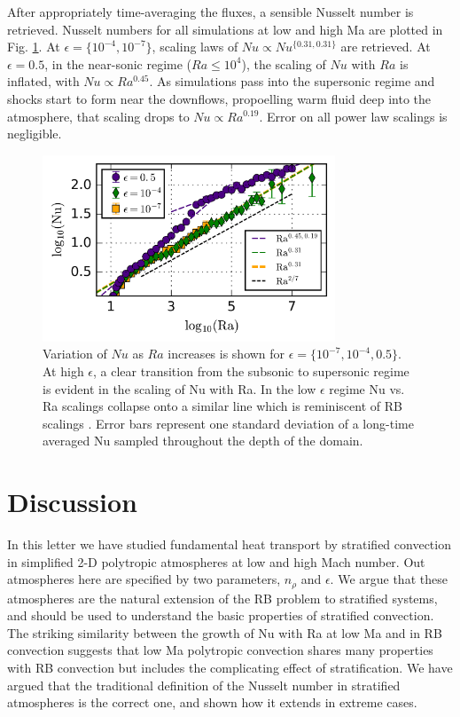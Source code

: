 \documentclass[aps, prl, twocolumn, nofootinbib, groupedaddress, amsfonts, amssymb, amsmath]{revtex4-1}
\newcommand{\nrho}{\ensuremath{n_{\rho}}}
\begin{document}
After appropriately time-averaging the fluxes, a sensible Nusselt number is retrieved.  Nusselt numbers for
all simulations at low and high Ma are plotted in Fig. \ref{fig:nu_v_ra}.  At $\epsilon = \{10^{-4}, 10^{-7}\}$,
scaling laws of $Nu \propto Nu^{\{0.31, 0.31\}}$ are retrieved.  At $\epsilon = 0.5$, in the near-sonic
regime ($Ra \leq 10^4$), the scaling of $Nu$ with $Ra$ is inflated, with $Nu \propto Ra^{0.45}$.  As simulations
pass into the supersonic regime and shocks start to form near the downflows, propoelling warm fluid deep
into the atmosphere, that scaling drops to $Nu \propto Ra^{0.19}$.  Error on all power law scalings is
negligible.

\begin{figure}[t]
\includegraphics[width=3.4375in]{./figs/nu_v_ra.png}
\caption{Variation of $Nu$ as $Ra$ increases is shown for $\epsilon = \{10^{-7}, 10^{-4}, 0.5\}$. 
At high $\epsilon$, a clear transition from the subsonic to supersonic regime is evident in the scaling
of Nu with Ra.  In the low $\epsilon$ regime Nu vs. Ra scalings collapse onto a similar line which is
reminiscent of RB scalings \cite{johnston&doering2009}.  Error bars represent one standard deviation
of a long-time averaged Nu sampled throughout the depth of the domain.
\label{fig:nu_v_ra} }
\end{figure}

\section{Discussion}
\label{sec:discussion}
In this letter we have studied fundamental heat transport by stratified convection in simplified 2-D polytropic
atmospheres at low and high Mach number.  Out atmospheres here are specified by two parameters, \nrho 
and $\epsilon$.  We argue that these atmospheres are the natural extension
of the RB problem to stratified systems, and should be used to understand the basic properties of stratified
convection.  The striking similarity between the growth of Nu with Ra at low Ma and in RB convection suggests
that low Ma polytropic convection shares many properties with RB convection but includes the complicating
effect of stratification. We have argued that the traditional definition of the Nusselt number in stratified atmospheres
\cite{graham1975} is the correct one, and shown how it extends in extreme cases.
\end{document}
